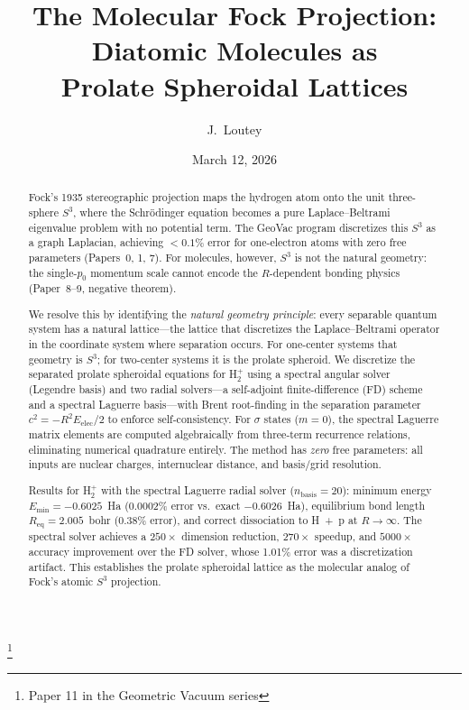 \documentclass[aps,pra,twocolumn,superscriptaddress,longbibliography]{revtex4-2}
\begin{document}
\title{The Molecular Fock Projection: Diatomic Molecules as\\
Prolate Spheroidal Lattices}
\thanks{Paper 11 in the Geometric Vacuum series}

\author{J.~Loutey}

\date{March 12, 2026}


\begin{abstract}
Fock's 1935 stereographic projection maps the hydrogen atom onto the
unit three-sphere $S^3$, where the Schr\"odinger equation becomes a
pure Laplace--Beltrami eigenvalue problem with no potential term.  The
GeoVac program discretizes this $S^3$ as a graph Laplacian, achieving
$<0.1\%$ error for one-electron atoms with zero free parameters
(Papers~0, 1, 7).  For molecules, however, $S^3$ is not the natural
geometry: the single-$p_0$ momentum scale cannot encode the
$R$-dependent bonding physics (Paper~8--9, negative theorem).

We resolve this by identifying the \emph{natural geometry principle}:
every separable quantum system has a natural lattice---the lattice
that discretizes the Laplace--Beltrami operator in the coordinate
system where separation occurs.  For one-center systems that geometry
is $S^3$; for two-center systems it is the prolate spheroid.  We
discretize the separated prolate spheroidal equations for H$_2^+$
using a spectral angular solver (Legendre basis) and two radial
solvers---a self-adjoint finite-difference (FD) scheme and a spectral
Laguerre basis---with Brent root-finding in the separation
parameter $c^2 = -R^2 E_{\mathrm{elec}}/2$ to enforce self-consistency.
For $\sigma$ states ($m = 0$), the spectral Laguerre matrix elements
are computed algebraically from three-term recurrence relations,
eliminating numerical quadrature entirely.
The method has \emph{zero} free parameters: all inputs are nuclear
charges, internuclear distance, and basis/grid resolution.

Results for H$_2^+$ with the spectral Laguerre radial solver
($n_{\mathrm{basis}} = 20$): minimum energy
$E_{\min} = -0.6025$~Ha (0.0002\% error vs.\ exact $-0.6026$~Ha),
equilibrium bond length $R_{\mathrm{eq}} = 2.005$~bohr
(0.38\% error), and correct dissociation to H~+~p at $R \to \infty$.
The spectral solver achieves a $250\times$ dimension reduction,
$270\times$ speedup, and $5000\times$ accuracy improvement over
the FD solver, whose 1.01\% error was a discretization artifact.
This establishes the prolate spheroidal lattice as the molecular
analog of Fock's atomic $S^3$ projection.
\end{abstract}
\end{document}
